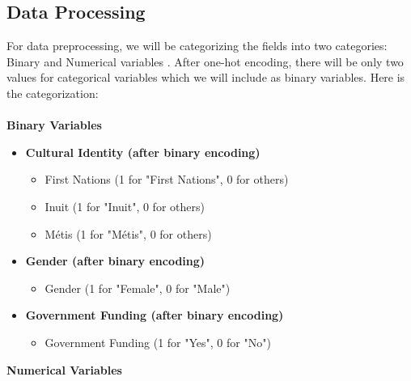 \documentclass[a4paper,twoside]{article}
\begin{document}
\subsection{Data Processing}
For data preprocessing, we will be categorizing the fields into two categories:
Binary and Numerical variables \cite{Mallikharjuna23}. After one-hot encoding, there will be
only two values for categorical variables which we will include as binary
variables. Here is the categorization:
\\
\\
\textbf{Binary Variables}

\begin{itemize}
    \item \textbf{Cultural Identity (after binary encoding)}
    \begin{itemize}
        \item First Nations (1 for "First Nations", 0 for others)
        \item Inuit (1 for "Inuit", 0 for others)
        \item Métis (1 for "Métis", 0 for others)
    \end{itemize}

    \item \textbf{Gender (after binary encoding)}
    \begin{itemize}
        \item Gender (1 for "Female", 0 for "Male")
    \end{itemize}

    \item \textbf{Government Funding (after binary encoding)}
    \begin{itemize}
        \item Government Funding (1 for "Yes", 0 for "No")
    \end{itemize}
\end{itemize}

\textbf{Numerical Variables}
\end{document}
